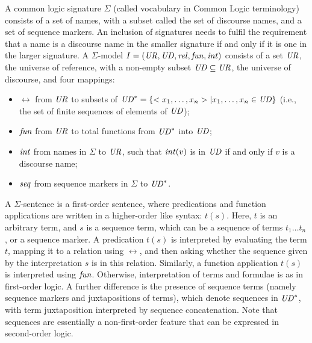 \documentclass[%
\ifpretendfinal
final%
\else
draft%
\fi,
a4paper,
wd]{isov2}
\begin{document}
\begin{definition}\label{CommonLogic}   
A common logic signature
$\Sigma$ (called vocabulary in Common Logic terminology) consists of a
set of names, with a subset called the set of discourse names, and a
set of sequence markers. An inclusion of signatures needs to fulfil the
requirement that a name is a discourse
name in the smaller signature if and only if it is one in the larger signature.  A $\Sigma$-model $I=(\mathit{UR},\mathit{UD},\mathit{rel},\mathit{fun},\mathit{int})$ consists of a set $\mathit{UR}$,
the universe of reference, with a non-empty subset $\mathit{UD}\subseteq \mathit{UR}$,
the universe of discourse, and four mappings:
  \begin{itemize}
   \item $\rel$ from $\mathit{UR}$ to subsets of $\mathit{UD}^* = \{<x_1,\ldots,x_n> |
x_1,\ldots,x_n \in \mathit{UD}\}$ (i.e., the set of finite sequences of
elements of $\mathit{UD}$);
   \item $\mathit{fun}$ from $\mathit{UR}$ to total functions from $\mathit{UD}^*$ into $\mathit{UD}$;
   \item $\mathit{int}$ from names in $\Sigma$ to $\mathit{UR}$, such that
$\mathit{int}(v)$ is in $\mathit{UD}$ if and only if $v$ is a discourse name;
   \item $\mathit{seq}$ from sequence markers in $\Sigma$ to $\mathit{UD}^*$.
  \end{itemize}  A $\Sigma$-sentence is a first-order
sentence, where predications and function applications are written
in a higher-order like syntax: $t(s)$.
Here, $t$ is an arbitrary term, and $s$ is a sequence term, which can
be a sequence of terms $t_1\ldots t_n$, or a sequence marker.
A predication $t(s)$ is interpreted by evaluating the term $t$,
mapping it to a relation using $\rel$, and then asking whether the sequence
given by the interpretation $s$ is in this relation.  
Similarly, a function application $t(s)$ is interpreted using $\mathit{fun}$.
Otherwise, interpretation of terms and formulae is as in
first-order logic. 
A further
difference is the presence of sequence terms (namely sequence markers and
juxtapositions of terms), which denote sequences in $\mathit{UD}^*$, with term
juxtaposition interpreted by sequence concatenation.
Note that sequences are essentially a non-first-order feature that
can be expressed in second-order logic.


\end{definition}
\end{document}
